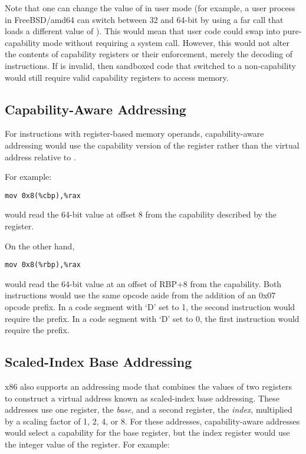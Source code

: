 Note that one can change the value of \CS{} in user mode (for example,
a user process in FreeBSD/amd64 can switch between 32 and 64-bit by
using a far call that loads a different value of \CS{}).  This would mean
that user code could swap into pure-capability mode without requiring
a system call.  However, this would not alter the contents of
capability registers or their enforcement, merely the decoding of
instructions.  If \DDC{} is invalid, then sandboxed code that switched to
a non-capability \CS{} would still require valid capability registers to
access memory.

\subsection{Capability-Aware Addressing}

For instructions with register-based memory operands, capability-aware
addressing would use the capability version of the register rather
than the virtual address relative to \DDC{}.

For example:

\begin{verbatim}
mov 0x8(%cbp),%rax
\end{verbatim}

would read the 64-bit value at offset 8 from the capability described
by the \CBP{} register.

On the other hand,

\begin{verbatim}
mov 0x8(%rbp),%rax
\end{verbatim}

would read the 64-bit value at an offset of RBP+8 from the \DDC{} capability.
Both instructions would use the same opcode aside from the addition of
an 0x07 opcode prefix.  In a code segment with `D' set to 1, the second
instruction would require the prefix.  In a code segment with `D' set to 0,
the first instruction would require the prefix.

\subsection{Scaled-Index Base Addressing}

x86 also supports an addressing mode that combines the values of two
registers to construct a virtual address known as scaled-index base
addressing.  These addresses use one register, the \emph{base}, and a
second register, the \emph{index}, multiplied by a scaling factor of 1, 2,
4, or 8.  For these addresses, capability-aware addresses would select
a capability for the base register, but the index register would use
the integer value of the register.  For example:

